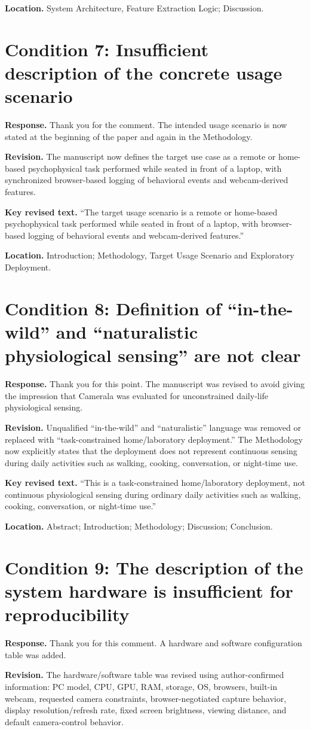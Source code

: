 \documentclass[11pt]{article}
\newcommand{\condition}[2]{\section*{Condition #1: #2}}
\begin{document}
\textbf{Location.}
System Architecture, Feature Extraction Logic; Discussion.

\condition{7}{Insufficient description of the concrete usage scenario}
\textbf{Response.}
Thank you for the comment.
The intended usage scenario is now stated at the beginning of the paper and again in the Methodology.

\textbf{Revision.}
The manuscript now defines the target use case as a remote or home-based psychophysical task performed while seated in front of a laptop, with synchronized browser-based logging of behavioral events and webcam-derived features.

\textbf{Key revised text.}
``The target usage scenario is a remote or home-based psychophysical task performed while seated in front of a laptop, with browser-based logging of behavioral events and webcam-derived features.''

\textbf{Location.}
Introduction; Methodology, Target Usage Scenario and Exploratory Deployment.

\condition{8}{Definition of ``in-the-wild'' and ``naturalistic physiological sensing'' are not clear}
\textbf{Response.}
Thank you for this point.
The manuscript was revised to avoid giving the impression that Camerala was evaluated for unconstrained daily-life physiological sensing.

\textbf{Revision.}
Unqualified ``in-the-wild'' and ``naturalistic'' language was removed or replaced with ``task-constrained home/laboratory deployment.''
The Methodology now explicitly states that the deployment does not represent continuous sensing during daily activities such as walking, cooking, conversation, or night-time use.

\textbf{Key revised text.}
``This is a task-constrained home/laboratory deployment, not continuous physiological sensing during ordinary daily activities such as walking, cooking, conversation, or night-time use.''

\textbf{Location.}
Abstract; Introduction; Methodology; Discussion; Conclusion.

\condition{9}{The description of the system hardware is insufficient for reproducibility}
\textbf{Response.}
Thank you for this comment.
A hardware and software configuration table was added.

\textbf{Revision.}
The hardware/software table was revised using author-confirmed information: PC model, CPU, GPU, RAM, storage, OS, browsers, built-in webcam, requested camera constraints, browser-negotiated capture behavior, display resolution/refresh rate, fixed screen brightness, viewing distance, and default camera-control behavior.
\end{document}
